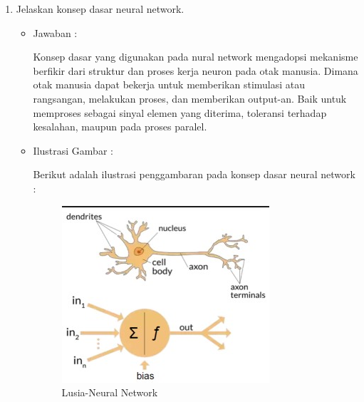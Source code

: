\begin{enumerate}
\item Jelaskan konsep dasar neural network.
	\begin{itemize}
	\item Jawaban :
		\par Konsep dasar yang digunakan pada nural network mengadopsi mekanisme berfikir dari struktur dan proses kerja neuron pada otak manusia. Dimana otak manusia dapat bekerja untuk memberikan stimulasi atau rangsangan, melakukan proses, dan memberikan output-an. Baik untuk memproses sebagai sinyal elemen yang diterima, toleransi terhadap kesalahan, maupun pada proses paralel.
	\item Ilustrasi Gambar :
		\par Berikut adalah ilustrasi penggambaran pada konsep dasar neural network :
		\begin{figure}[!hbtp]
		\centering
		\includegraphics[scale=0.4]{figures/s2.jpg}
		\caption{Lusia-Neural Network}
		\label{6A2}
		\end{figure}
	\end{itemize}
	

\end{enumerate}
